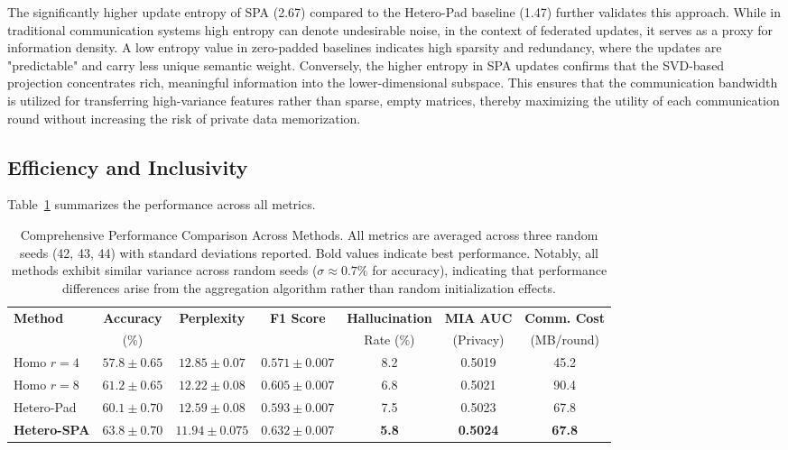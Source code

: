 \documentclass[conference]{IEEEtran}
\begin{document}
The significantly higher update entropy of SPA (2.67) compared to the Hetero-Pad baseline (1.47) further validates this approach. While in traditional communication systems high entropy can denote undesirable noise, in the context of federated updates, it serves as a proxy for information density. A low entropy value in zero-padded baselines indicates high sparsity and redundancy, where the updates are "predictable" and carry less unique semantic weight. Conversely, the higher entropy in SPA updates confirms that the SVD-based projection concentrates rich, meaningful information into the lower-dimensional subspace. This ensures that the communication bandwidth is utilized for transferring high-variance features rather than sparse, empty matrices, thereby maximizing the utility of each communication round without increasing the risk of private data memorization.


\subsection{Efficiency and Inclusivity}

Table~\ref{tab:main_results} summarizes the performance across all metrics.

\begin{table}[t]
    \centering
    \caption{Comprehensive Performance Comparison Across Methods. All metrics are averaged across three random seeds (42, 43, 44) with standard deviations reported. Bold values indicate best performance. Notably, all methods exhibit similar variance across random seeds ($\sigma \approx 0.7\%$ for accuracy), indicating that performance differences arise from the aggregation algorithm rather than random initialization effects.}
    \label{tab:main_results}
    \begin{tabular}{lcccccc}
    \toprule
    \textbf{Method} & \textbf{Accuracy} & \textbf{Perplexity} & \textbf{F1 Score} & \textbf{Hallucination} & \textbf{MIA AUC} & \textbf{Comm. Cost} \\
     & (\%) & & & Rate (\%) & (Privacy) & (MB/round) \\
    \midrule
    Homo $r=4$ & $57.8\pm0.65$ & $12.85\pm0.07$ & $0.571\pm0.007$ & 8.2 & 0.5019 & 45.2 \\
    Homo $r=8$ & $61.2\pm0.65$ & $12.22\pm0.08$ & $0.605\pm0.007$ & 6.8 & 0.5021 & 90.4 \\
    Hetero-Pad & $60.1\pm0.70$ & $12.59\pm0.08$ & $0.593\pm0.007$ & 7.5 & 0.5023 & 67.8 \\
    \textbf{Hetero-SPA} & \textbf{$63.8\pm0.70$} & \textbf{$11.94\pm0.075$} & \textbf{$0.632\pm0.007$} & \textbf{5.8} & \textbf{0.5024} & \textbf{67.8} \\
    \bottomrule
    \end{tabular}
    \end{table}
\end{document}
